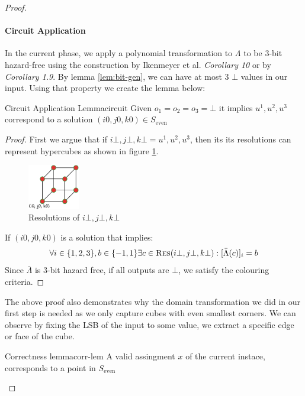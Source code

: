\begin{proof}
\paragraph{Circuit Application}

In the current phase, we apply a polynomial transformation to $\Lambda$ to be 3-bit hazard-free using the construction
by Ikenmeyer et al. \cite{ikenmeyer_ComplexityHazardfreeCircuits_2019} \textit{Corollary 10} or 
by \cite{bund_SmallHazardFreeTransducers_2025} \textit{Corollary 1.9}.
By lemma \ref{lem:bit-gen}, we can have at most 3 $\bot$ values 
in our input. Using that property we create the lemma below:

\begin{lemmabox}{Circuit Application Lemma}{circuit}
    Given $o_1 = o_2 = o_3 = \bot$ it implies $u^1, u^2, u^3$ correspond to a solution $(i0,j0,k0) \in S_\text{even}$
\end{lemmabox}


\begin{proof}
    First we argue that if $i\bot, j\bot, k\bot = u^1, u^2, u^3$, then
    its its resolutions can represent hypercubes as shown in figure \ref{fig:main-proof:cube-vis}.
    \begin{figure}[h!]
        \centering
        \includegraphics[width=0.2\textwidth]{assets/3d-cube.png}
        \caption{Resolutions of $i\bot, j\bot, k\bot$}\label{fig:main-proof:cube-vis}
    \end{figure}

    If $(i0, j0, k0)$ is a solution that implies:
    $$
    \forall i \in \{1,2,3\}, b \in \{-1, 1\} \exists c \in \textsc{Res}(i\bot, j\bot, k\bot): [\bar{\Lambda}(c)]_i = b
    $$
    Since $\bar{\Lambda}$ is 3-bit hazard free, if all outputs are $\bot$, we satisfy the colouring criteria.
\end{proof}
The above proof also demonstrates why the domain transformation we did in our first step is needed as we only
capture cubes with even smallest corners.  We can observe by fixing the LSB of the input to some value,
we extract a specific edge or face of the cube.


\begin{lemmabox}{Correctness lemma}{corr-lem}
    A valid assingment $x$ of the current instace, corresponds to a point in $S_{\text{even}}$
\end{lemmabox}


\end{proof}

